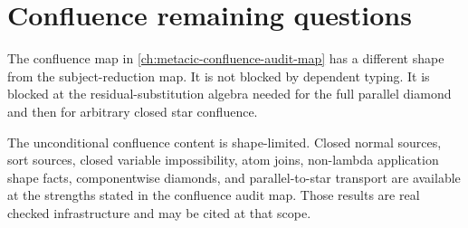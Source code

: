 \section{Confluence remaining questions}
\label{sec:metacic-open-problems-confluence}

The confluence map in \autoref{ch:metacic-confluence-audit-map} has a different
shape from the subject-reduction map. It is not blocked by dependent typing.
It is blocked at the residual-substitution algebra needed for the full
parallel diamond and then for arbitrary closed star confluence.

The unconditional confluence content is shape-limited. Closed normal sources,
sort sources, closed variable impossibility, atom joins, non-lambda application
shape facts, componentwise diamonds, and parallel-to-star transport are
available at the strengths stated in the confluence audit map. Those results
are real checked infrastructure and may be cited at that scope.

